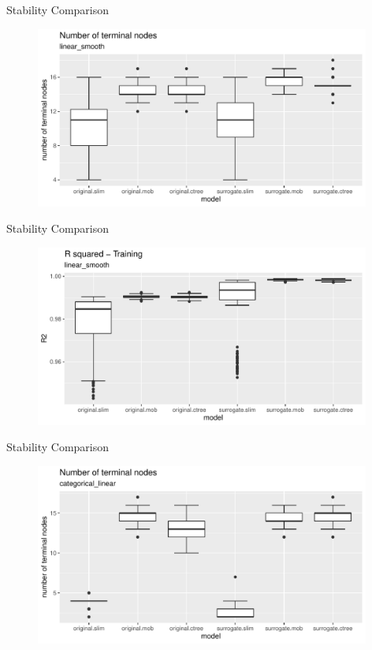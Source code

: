 \documentclass[9pt, xcolor=table]{beamer}
\begin{document}
\begin{frame}{Stability Comparison}
\begin{figure}
    \includegraphics[width=11cm]{Figures/Stability/linear_smooth/nofnodes.pdf}
\end{figure}
\end{frame}


\begin{frame}{Stability Comparison}
\begin{figure}
    \includegraphics[width=11cm]{Figures/Stability/linear_smooth/r2_train.pdf}
\end{figure}
\end{frame}

\begin{frame}{Stability Comparison}
\begin{figure}
    \includegraphics[width=11cm]{Figures/Stability/categorical_linear/nofnodes.pdf}
\end{figure}
\end{frame}
\end{document}

